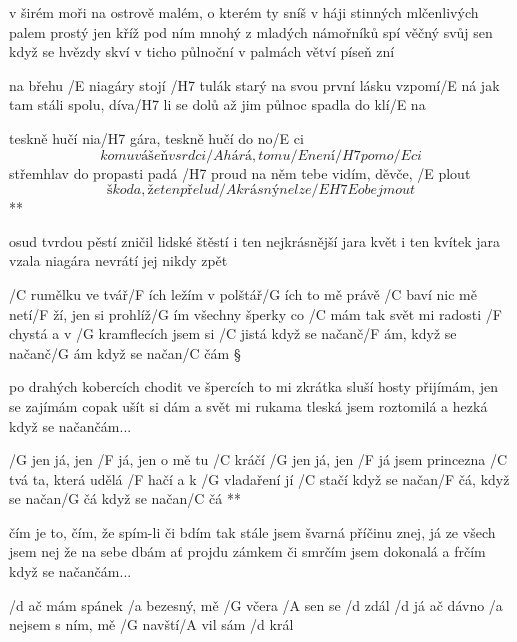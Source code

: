 v širém moři na ostrově malém, o kterém ty sníš
v háji stinných mlčenlivých palem prostý jen kříž
pod ním mnohý z mladých námořníků spí věčný svůj sen
když se hvězdy skví v ticho půlnoční v palmách větví píseň zní





na břehu /E niagáry stojí /H7 tulák starý
na svou první lásku vzpomí/E ná
jak tam stáli spolu, díva/H7 li se dolů
až jim půlnoc spadla do klí/E na

\R teskně hučí nia/H7 gára, teskně hučí do no/E ci
   \[ komu vášeň v srdci /A hárá, tomu /E není /H7 pomo/E ci \]
   střemhlav do propasti padá /H7 proud
   na něm tebe vidím, děvče, /E plout
   \[ škoda, že ten přelud /A krásný nelze /{E H7 E} obejmout \]**

osud tvrdou pěstí zničil lidské štěstí
i ten nejkrásnější jara květ
i ten kvítek jara vzala niagára
nevrátí jej nikdy zpět




/C rumělku ve tvář/F ích ležím v polštář/G ích
to mě právě /C baví
nic mě netí/F ží, jen si prohlíž/G ím
všechny šperky co /C mám
tak svět mi radosti /F chystá
a v /G kramflecích jsem si /C jistá
když se načanč/F ám, když se načanč/G ám
když se načan/C čám \S

po drahých kobercích chodit ve špercích
to mi zkrátka sluší
hosty přijímám, jen se zajímám
copak ušít si dám
a svět mi rukama tleská
jsem roztomilá a hezká
když se načančám...

\R /G jen já, jen /F já, jen o mě tu /C kráčí
   /G jen já, jen /F já jsem princezna /C tvá
   ta, která udělá /F hačí a k /G vladaření jí /C stačí
   když se načan/F čá, když se načan/G čá
   když se načan/C čá **

čím je to, čím, že spím-li či bdím
tak stále jsem švarná
příčinu znej, já ze všech jsem nej
že na sebe dbám
ať projdu zámkem či smrčím
jsem dokonalá a frčím
když se načančám...




/d ač mám spánek /a bezesný, mě /G včera /A sen se /d zdál
/d já ač dávno /a nejsem s ním, mě /G navští/A vil sám /d král

